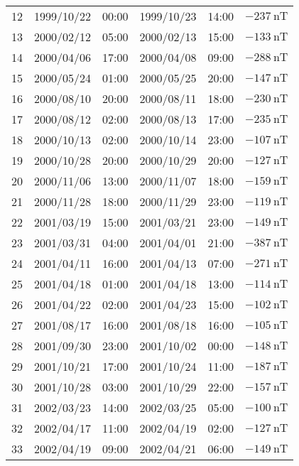 \begin{table}[ht]
\begin{adjustbox}{width=\textwidth,totalheight=0.9\textheight,keepaspectratio}
\begin{tabular}{cccccc}
    12 & 1999/10/22 & 00:00 & 1999/10/23 & 14:00 & $ \SI{-237}{\nano\tesla}$ \\
    13 & 2000/02/12 & 05:00 & 2000/02/13 & 15:00 & $ \SI{-133}{\nano\tesla}$ \\
    14 & 2000/04/06 & 17:00 & 2000/04/08 & 09:00 & $ \SI{-288}{\nano\tesla}$ \\
    15 & 2000/05/24 & 01:00 & 2000/05/25 & 20:00 & $ \SI{-147}{\nano\tesla}$ \\
    16 & 2000/08/10 & 20:00 & 2000/08/11 & 18:00 & $ \SI{-230}{\nano\tesla}$ \\
    17 & 2000/08/12 & 02:00 & 2000/08/13 & 17:00 & $ \SI{-235}{\nano\tesla}$ \\
    18 & 2000/10/13 & 02:00 & 2000/10/14 & 23:00 & $ \SI{-107}{\nano\tesla}$ \\
    19 & 2000/10/28 & 20:00 & 2000/10/29 & 20:00 & $ \SI{-127}{\nano\tesla}$ \\
    20 & 2000/11/06 & 13:00 & 2000/11/07 & 18:00 & $ \SI{-159}{\nano\tesla}$ \\
    21 & 2000/11/28 & 18:00 & 2000/11/29 & 23:00 & $ \SI{-119}{\nano\tesla}$ \\
    22 & 2001/03/19 & 15:00 & 2001/03/21 & 23:00 & $ \SI{-149}{\nano\tesla}$ \\
    23 & 2001/03/31 & 04:00 & 2001/04/01 & 21:00 & $ \SI{-387}{\nano\tesla}$ \\
    24 & 2001/04/11 & 16:00 & 2001/04/13 & 07:00 & $ \SI{-271}{\nano\tesla}$ \\
    25 & 2001/04/18 & 01:00 & 2001/04/18 & 13:00 & $ \SI{-114}{\nano\tesla}$ \\
    26 & 2001/04/22 & 02:00 & 2001/04/23 & 15:00 & $ \SI{-102}{\nano\tesla}$ \\
    27 & 2001/08/17 & 16:00 & 2001/08/18 & 16:00 & $ \SI{-105}{\nano\tesla}$ \\
    28 & 2001/09/30 & 23:00 & 2001/10/02 & 00:00 & $ \SI{-148}{\nano\tesla}$ \\
    29 & 2001/10/21 & 17:00 & 2001/10/24 & 11:00 & $ \SI{-187}{\nano\tesla}$ \\
    30 & 2001/10/28 & 03:00 & 2001/10/29 & 22:00 & $ \SI{-157}{\nano\tesla}$ \\
    31 & 2002/03/23 & 14:00 & 2002/03/25 & 05:00 & $ \SI{-100}{\nano\tesla}$ \\
    32 & 2002/04/17 & 11:00 & 2002/04/19 & 02:00 & $ \SI{-127}{\nano\tesla}$ \\
    33 & 2002/04/19 & 09:00 & 2002/04/21 & 06:00 & $ \SI{-149}{\nano\tesla}$ \\

\end{tabular}
\end{adjustbox}
\end{table}
